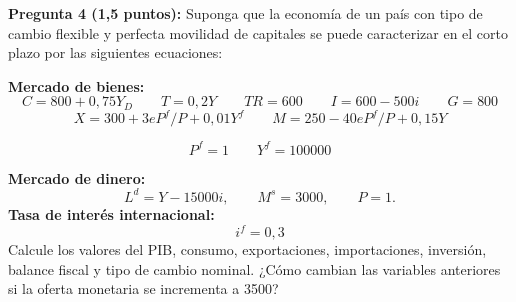 \documentclass[11pt,addpoints]{article}
\begin{document}
\vspace{0.3cm}
\textbf{Pregunta 4 (1,5 puntos):}  
Suponga que la economía de un país con tipo de cambio flexible y perfecta movilidad de capitales se puede caracterizar en el corto plazo por las siguientes ecuaciones:

\textbf{Mercado de bienes:}
\[
C = 800 + 0{,}75Y_D \qquad T = 0{,}2Y \qquad TR = 600 \qquad I = 600 - 500i \qquad G = 800
\]
\[
X = 300 + 3eP^f/P + 0{,}01Y^f \qquad M = 250 - 40eP^f/P + 0{,}15Y
\]

\[
P^f = 1 \qquad Y^f = 100000
\]

\textbf{Mercado de dinero:}
\[
L^d = Y - 15000i, \qquad M^s = 3000, \qquad P = 1.
\]
\textbf{Tasa de interés internacional:}
\[
i^f = 0,3
\]
Calcule los valores del PIB, consumo, exportaciones, importaciones, inversión, balance fiscal y tipo de cambio nominal.  
¿Cómo cambian las variables anteriores si la oferta monetaria se incrementa a 3500?
\end{document}
